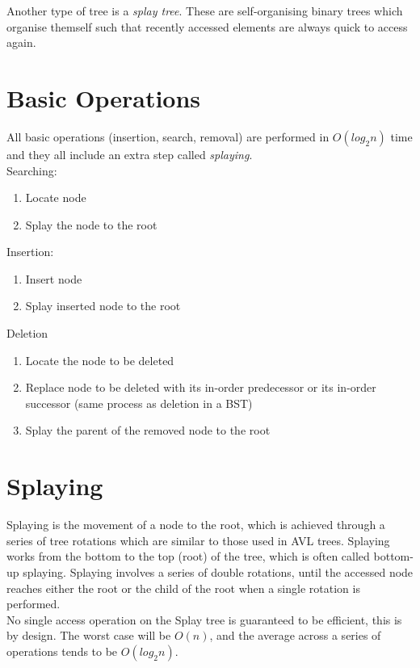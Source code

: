 
Another type of tree is a \textit{splay tree}. These are self-organising binary trees which organise themself such that recently accessed elements are always quick to access again. 

\section{Basic Operations}
All basic operations (insertion, search, removal) are performed in $O(log_2n)$ time and they all include an extra step called \textit{splaying}.\\

Searching:
\begin{enumerate}
    \item Locate node
    \item Splay the node to the root
\end{enumerate}

Insertion:
\begin{enumerate}
    \item Insert node
    \item Splay inserted node to the root
\end{enumerate}

Deletion
\begin{enumerate}
    \item Locate the node to be deleted
    \item Replace node to be deleted with its in-order predecessor or its in-order successor (same process as deletion in a BST)
    \item Splay the parent of the removed node to the root
\end{enumerate}

\section{Splaying}
Splaying is the movement of a node to the root, which is achieved through a series of tree rotations which are similar to those used in AVL trees. Splaying works from the bottom to the top (root) of the tree, which is often called bottom-up splaying. Splaying involves a series of double rotations, until the accessed node reaches either the root or the child of the root when a single rotation is performed.\\

No single access operation on the Splay tree is guaranteed to be efficient, this is by design. The worst case will be $O(n)$, and the average across a series of operations tends to be $O(log_2n)$. 

